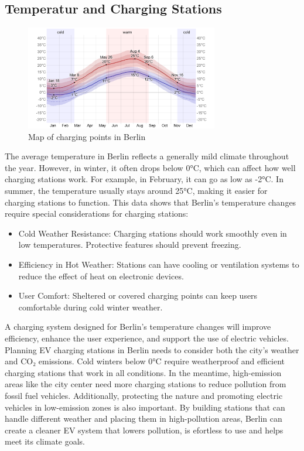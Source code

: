 \subsection{Temperatur and Charging Stations}
\begin{figure}[hbt!]
\begin{center}
\includegraphics[width=0.75\textwidth]{Bilder/kaan4.png}
\caption{Map of charging points in Berlin}\label{fig:kaan4}
\end{center}
\end{figure}
The average temperature in Berlin reflects a generally mild climate throughout the year. However, in winter, it often drops below 0°C, which can affect how well charging stations work. For example, in February, it can go as low as -2°C. In summer, the temperature usually stays around 25°C, making it easier for charging stations to function.
This data shows that Berlin's temperature changes require special considerations for charging stations:
\begin{itemize}
    \item Cold Weather Resistance: Charging stations should work smoothly even in low temperatures. Protective features should prevent freezing.
    \item Efficiency in Hot Weather: Stations can have cooling or ventilation systems to reduce the effect of heat on electronic devices.
    \item User Comfort: Sheltered or covered charging points can keep users comfortable during cold winter weather.
\end{itemize}
A charging system designed for Berlin's temperature changes will improve efficiency, enhance the user experience, and support the use of electric vehicles. Planning EV charging stations in Berlin needs to consider both the city's weather and CO₂ emissions. Cold winters below 0°C require weatherproof and efficient charging stations that work in all conditions. In the meantime, high-emission areas like the city center need more charging stations to reduce pollution from fossil fuel vehicles. Additionally, protecting the nature and promoting electric vehicles in low-emission zones is also important. By building stations that can handle different weather and placing them in high-pollution areas, Berlin can create a cleaner EV system that lowers pollution, is efortless to use and helps meet its climate goals.

